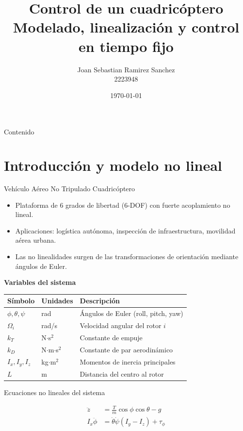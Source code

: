 \documentclass{beamer}
\title{Control de un cuadricóptero\\Modelado, linealización y control en tiempo fijo}
\author{Joan Sebastian Ramirez Sanchez\\2223948}
\institute{Introducción a la teoría de control}
\date{\today}
\begin{document}
\begin{frame}
\titlepage
\end{frame}

\begin{frame}{Contenido}
\tableofcontents
\end{frame}

\section{Introducción y modelo no lineal}

\begin{frame}{Vehículo Aéreo No Tripulado Cuadricóptero}
\begin{itemize}
    \item Plataforma de 6 grados de libertad (6-DOF) con fuerte acoplamiento no lineal.
    \item Aplicaciones: logística autónoma, inspección de infraestructura, movilidad aérea urbana.
    \item Las no linealidades surgen de las transformaciones de orientación mediante ángulos de Euler.
\end{itemize}
\vspace{0.5cm}
\textbf{Variables del sistema}
\begin{table}[h]
\small
\begin{tabular}{lll}
\hline
\textbf{Símbolo} & \textbf{Unidades} & \textbf{Descripción} \\
\hline
$\phi, \theta, \psi$ & rad & Ángulos de Euler (roll, pitch, yaw) \\
$\Omega_i$ & rad/s & Velocidad angular del rotor $i$ \\
$k_T$ & N$\cdot$s$^2$ & Constante de empuje \\
$k_D$ & N$\cdot$m$\cdot$s$^2$ & Constante de par aerodinámico \\
$I_x, I_y, I_z$ & kg$\cdot$m$^2$ & Momentos de inercia principales \\
$L$ & m & Distancia del centro al rotor \\
\hline
\end{tabular}
\end{table}
\end{frame}

\begin{frame}{Ecuaciones no lineales del sistema}
\begin{tcolorbox}[colback=brown!10!white, colframe=brown!60!black, title=No linealidades principales]
\begin{align*}
    \ddot{z} &= \frac{T}{m} \cos\phi \cos\theta - g \\
    I_x \ddot{\phi} &= \dot{\theta}\dot{\psi}(I_y - I_z) + \tau_\phi
\end{align*}
\end{tcolorbox}
\end{frame}
\end{document}
